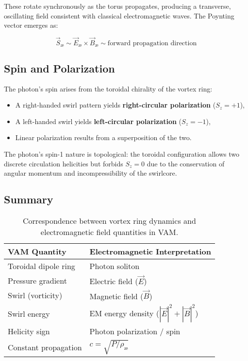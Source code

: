 \noindent
These rotate synchronously as the torus propagates, producing a transverse, oscillating field consistent with classical electromagnetic waves. The Poynting vector emerges as:

\begin{equation}
    \vec{S}_\text{æ} \sim \vec{E}_\text{æ} \times \vec{B}_\text{æ} \sim \text{forward propagation direction}
\end{equation}

\subsection{Spin and Polarization}

The photon’s spin arises from the toroidal chirality of the vortex ring:

\begin{itemize}
    \item A right-handed swirl pattern yields \textbf{right-circular polarization} ($S_z = +1$),
    \item A left-handed swirl yields \textbf{left-circular polarization} ($S_z = -1$),
    \item Linear polarization results from a superposition of the two.
\end{itemize}

The photon's spin-1 nature is topological: the toroidal configuration allows two discrete circulation helicities but forbids $S_z = 0$ due to the conservation of angular momentum and incompressibility of the swirlcore.

\subsection{Summary}

\begin{table}[H]
\centering
\renewcommand{\arraystretch}{1.3}
\begin{tabular}{ll}
\toprule
\textbf{VAM Quantity} & \textbf{Electromagnetic Interpretation} \\
\midrule
Toroidal dipole ring     & Photon soliton \\
Pressure gradient        & Electric field ($\vec{E}$) \\
Swirl (vorticity)        & Magnetic field ($\vec{B}$) \\
Swirl energy             & EM energy density ($|\vec{E}|^2 + |\vec{B}|^2$) \\
Helicity sign            & Photon polarization / spin \\
Constant propagation     & $c = \sqrt{P/\rho_\text{\ae}}$ \\
\bottomrule
\end{tabular}
\caption{Correspondence between vortex ring dynamics and electromagnetic field quantities in VAM.}
\end{table}

